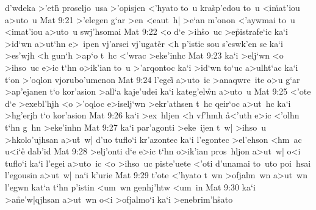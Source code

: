 d'wdeka
>'et\r{h}
proseljo~usa
>'opisjen
<'hyato
to~u
kra\r{s}p'edou
to~u
<i\r{m}at'iou
a>uto~u\bibvsend
\vs Mat 9:21
>'elegen
g`ar
>en
<eaut~h|
>e`an
m'onon
<'aywmai
to~u
<imat'iou
a>uto~u
swj'hsomai\bibvsend
\vs Mat 9:22
<o
d`e
>ih\r{s}o~uc
>e\r{p}istrafe`ic
ka`i
>id`wn
a>ut`hn
e>~ipen
vj'arsei
vj'ugat\r{e}r
<h
p'istic
sou
s'eswk'en
se
ka`i
>es'wjh
<h
gun`h
>ap`o
t~hc
<'wrac
>eke'inhc\bibvsend
\vs Mat 9:23
ka`i
>elj`wn
<o
>ihso~uc
e>ic
t`hn
o>ik'ian
to~u
>'arqontoc
ka`i
>id`wn
to`uc
a>ulht`ac
ka`i
t`on
>'oqlon
vjorubo'umenon\bibvsend
\vs Mat 9:24
l'egei\r{}
a>uto~ic
>anaqwre~ite
o>u
g`ar
>ap'ejanen
t`o
kor'asion
>all`a
kaje'udei
ka`i
kateg'el\r{w}n
a>uto~u\bibvsend
\vs Mat 9:25
<'ote
d`e
>exebl'hjh
<o
>'oqloc
e>iselj`wn
>ekr'athsen
t~hc
qeir`oc
a>ut~hc
ka`i
>hg'erjh
t`o
kor'asion\bibvsend
\vs Mat 9:26
ka`i
>ex~hljen
<h
vf'hmh
\r{a}<'uth
e>ic
<'olhn
t`hn
g~hn
>eke'inhn\bibvsend
\vs Mat 9:27
ka`i
par'agonti
>eke~ijen
t~w|
>ihso~u
>hkolo'ujhsan
a>u\r{t}~w|
d'uo
tuflo`i
kr'azontec
ka`i
l'egontec
>el'ehson
<hm~ac
u<i`e\r{}
dab'id\bibvsend
\vs Mat 9:28
>elj'onti
d`e
e>ic
t`hn
o>ik'ian
pros~hljon
a>ut~w|
o<i
tuflo`i
ka`i
l'egei
a>uto~ic
<o
>ihso~uc
piste'uete
<'oti
d'unamai
to~uto
poi~hsai
l'egousin
a>ut~w|
na`i
k'urie\bibvsend
\vs Mat 9:29
t'ote
<'hyato
t~wn
>ofjalm~wn
a>ut~wn
l'egwn
kat`a
t`hn
p'istin
<um~wn
genhj'htw
<um~in\bibvsend
\vs Mat 9:30
ka`i
>a\r{n}e'w|qjhsan
a>ut~wn
o<i
>ofjalmo`i
ka`i
>enebrim'h\r{s}ato
